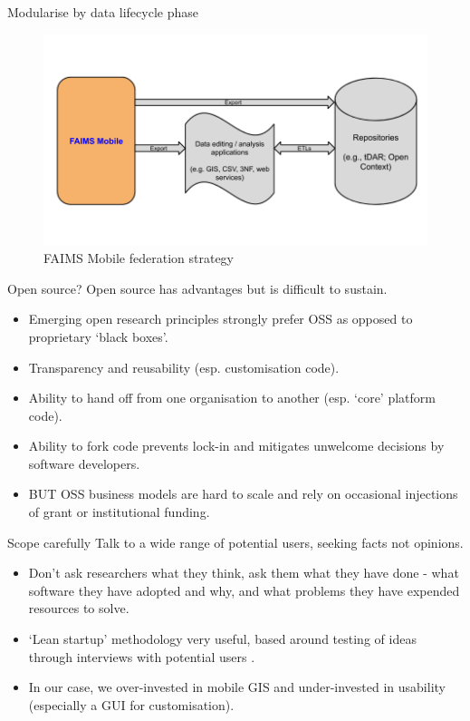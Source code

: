 \begin{frame}{Modularise by data lifecycle phase}
 \begin{figure}[H]
    \centering
    \vspace{-0.5cm}
        \includegraphics[height=.75\textheight]{figures/FAIMS-federation.png}
        \caption{FAIMS Mobile federation strategy}
        \label{fig:figure13}
 \end{figure}
\end{frame}
\begin{frame}{Open source?}
  Open source has advantages but is difficult to sustain.
      \begin{itemize}
        \item Emerging open research principles strongly prefer OSS as opposed to proprietary ‘black boxes’.
        \item Transparency and reusability (esp. customisation code).
        \item Ability to hand off from one organisation to another (esp. `core' platform code).
        \item Ability to fork code prevents lock-in and mitigates unwelcome decisions by software developers.
        \item BUT OSS business models are hard to scale and rely on occasional injections of grant or institutional funding.
    \end{itemize}
\end{frame}
\begin{frame}{Scope carefully}
  Talk to a wide range of potential users, seeking facts not opinions.
      \begin{itemize}
        \item Don’t ask researchers what they think, ask them what they have done - what software they have adopted and why, and what problems they have expended resources to solve. 
        \item ‘Lean startup’ methodology very useful, based around  testing of ideas through interviews with potential users \parencite{Strategyzer_AG2019-uu}.
        \item In our case, we over-invested in mobile GIS and under-invested in usability (especially a GUI for customisation).
    \end{itemize}
\end{frame}
